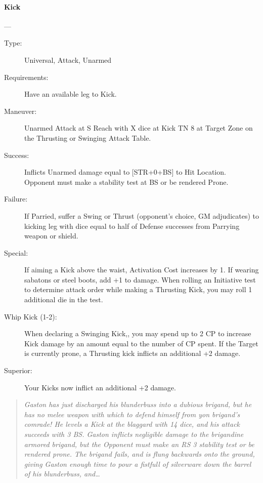 \documentclass[oneside,11pt,english]{book}
\begin{document}
\paragraph{\large\label{man:Kick}Kick}---\quad{\large[X]}
\vspace{-10pt}\begin{description} 
\item [Type:] Universal, Attack, Unarmed 
\item [Requirements:] Have an available leg to Kick. 
\item [Maneuver:] Unarmed Attack at S Reach with X dice at Kick TN 8 at Target
  Zone on the Thrusting or Swinging Attack Table.  
\item [Success:] Inflicts Unarmed damage equal to [STR+0+BS] to Hit Location. Opponent must make a stability 
  test at BS or be rendered Prone. 
\item [Failure:] If Parried, suffer a Swing or Thrust (opponent’s choice, GM adjudicates) to kicking leg with 
  dice equal to half of Defense successes from Parrying weapon or shield. 
\item [Special:] If aiming a Kick above the waist, Activation Cost increases by 1. If wearing sabatons or steel 
  boots, add +1 to damage. 
  When rolling an Initiative test to determine attack order while making a Thrusting Kick, you may roll 1 
  additional die in the test. 
\item [Whip Kick (1-2):] When declaring a Swinging Kick,, you may spend up to 2 CP to increase Kick damage 
  by an amount equal to the number of CP spent. 
  If the Target is currently prone, a Thrusting kick inflicts an additional +2 damage. 
\item [Superior:] Your Kicks now inflict an additional +2 damage. 
\end{description}
\begin{quotation}
  \emph{Gaston has just discharged his blunderbuss into a dubious brigand, but
    he has no melee weapon with which to defend himself from yon brigand’s
    comrade! He levels a Kick at the blaggard with 14 dice, and his attack
    succeeds with 3 BS. Gaston inflicts negligible damage to the brigandine
    armored brigand, but the Opponent must make an RS 3 stability test or be
    rendered prone. The brigand fails, and is flung backwards onto the ground,
    giving Gaston enough time to pour a fistfull of silverware down the barrel
    of his blunderbuss, and\ldots} 
\end{quotation}
\end{document}
